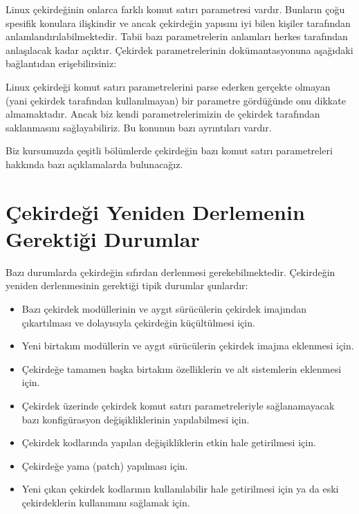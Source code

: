 \documentclass[a4paper,10pt,turkish]{sphinxmanual}
\begin{document}
\sphinxAtStartPar
Linux çekirdeğinin onlarca farklı komut satırı parametresi vardır. Bunların çoğu spesifik konulara
ilişkindir ve ancak çekirdeğin yapısını iyi bilen kişiler tarafından anlamlandırılabilmektedir. Tabii
bazı parametrelerin anlamları herkes tarafından anlaşılacak kadar açıktır. Çekirdek parametrelerinin
dokümantasyonuna aşağıdaki bağlantıdan erişebilirsiniz:
\begin{quote}

\sphinxAtStartPar
{}
\end{quote}

\sphinxAtStartPar
Linux çekirdeği komut satırı parametrelerini parse ederken gerçekte olmayan (yani çekirdek tarafından
kullanılmayan) bir parametre gördüğünde onu dikkate almamaktadır. Ancak biz kendi parametrelerimizin de
çekirdek tarafından saklanmasını sağlayabiliriz. Bu konunun bazı ayrıntıları vardır.

\sphinxAtStartPar
Biz kursumuzda çeşitli bölümlerde çekirdeğin bazı komut satırı parametreleri hakkında bazı
açıklamalarda bulunacağız.


\section{Çekirdeği Yeniden Derlemenin Gerektiği Durumlar}
\label{\detokenize{kernelcompilation:cekirdegi-yeniden-derlemenin-gerektigi-durumlar}}
\sphinxAtStartPar
Bazı durumlarda çekirdeğin sıfırdan derlenmesi gerekebilmektedir. Çekirdeğin yeniden derlenmesinin
gerektiği tipik durumlar şunlardır:
\begin{itemize}
\item {} 
\sphinxAtStartPar
Bazı çekirdek modüllerinin ve aygıt sürücülerin çekirdek imajından çıkartılması ve dolayısıyla
çekirdeğin küçültülmesi için.

\item {} 
\sphinxAtStartPar
Yeni birtakım modüllerin ve aygıt sürücülerin çekirdek imajına eklenmesi için.

\item {} 
\sphinxAtStartPar
Çekirdeğe tamamen başka birtakım özelliklerin ve alt sistemlerin eklenmesi için.

\item {} 
\sphinxAtStartPar
Çekirdek üzerinde çekirdek komut satırı parametreleriyle sağlanamayacak bazı konfigürasyon
değişikliklerinin yapılabilmesi için.

\item {} 
\sphinxAtStartPar
Çekirdek kodlarında yapılan değişikliklerin etkin hale getirilmesi için.

\item {} 
\sphinxAtStartPar
Çekirdeğe yama (patch) yapılması için.

\item {} 
\sphinxAtStartPar
Yeni çıkan çekirdek kodlarının kullanılabilir hale getirilmesi için ya da eski çekirdeklerin
kullanımını sağlamak için.

\end{itemize}
\end{document}
